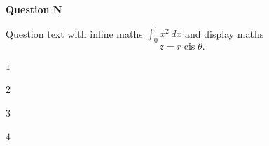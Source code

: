 \documentclass[border=1pt,varwidth=16cm]{standalone}
\begin{document}
\textbf{Question N} 

Question text with inline maths $\int_0^1 x^2\,dx$ and display maths
\[ z = r\operatorname{cis}\theta. \]

\begin{options}
  \item $1$
  \item $2$
  \item $3$
  \item $4$
\end{options}
\end{document}
